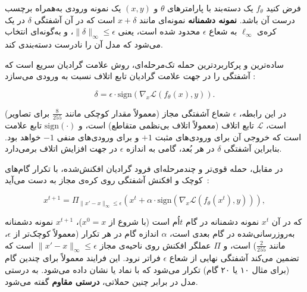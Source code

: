 \documentclass[11pt]{article}
\begin{document}
فرض کنید $f_{\theta}$ یک دسته‌بند با پارامترهای $\theta$ و $(x, y)$ یک نمونه‌ ورودی به‌همراه برچسب درست آن باشد.
\textbf{نمونه دشمنانه} نمونه‌ای مانند $x + \delta$ است که در آن آشفتگی $\delta$ در یک کره‌ی $\ell_{\infty}$ به شعاع $\epsilon$ محدود شده است،
یعنی $\|\delta\|_{\infty} \le \epsilon$، و به‌گونه‌ای انتخاب می‌شود که مدل آن را نادرست دسته‌بندی کند.

ساده‌ترین و پرکاربردترین حمله‌ تک‌مرحله‌ای، روش علامت گرادیان سریع است
که آشفتگی را در جهت علامت گرادیان تابع اتلاف نسبت به ورودی می‌سازد \cite{goodfellow2015explaining}:

\begin{equation}
\delta = \epsilon \cdot \mathrm{sign}\!\left( \nabla_{x} \mathcal{L}(f_{\theta}(x), y) \right).
\end{equation}

در این رابطه، $\epsilon$ شعاع آشفتگی مجاز (معمولاً مقدار کوچکی مانند $\frac{8}{255}$ برای تصاویر) است،
$\mathcal{L}$ تابع اتلاف (معمولاً اتلاف بی‌نظمی متقاطع) است،
و $\mathrm{sign}(\cdot)$ تابع علامت است که خروجی آن برای ورودی‌های مثبت $+1$ و برای ورودی‌های منفی $-1$ خواهد بود.
بنابراین آشفتگی $\delta$ در هر بُعد، گامی به اندازه‌ $\epsilon$ در جهت افزایش اتلاف برمی‌دارد.

در مقابل، حمله‌ قوی‌تر و چندمرحله‌ای فرود گرادیان افکنش‌شده،
با تکرار گام‌های کوچک و افکنش آشفتگی روی کره‌ی مجاز به دست می‌آید~\cite{madry2018towards}:

\begin{equation}
x^{t+1} = \Pi_{\|x'-x\|_{\infty}\le\epsilon}\!\left( x^{t} + \alpha \cdot \mathrm{sign}\!\left( \nabla_{x} \mathcal{L}(f_{\theta}(x^{t}), y) \right) \right),
\end{equation}

که در آن $x^{t}$ نمونه‌ دشمنانه در گام $t$اُم است (با شروع از $x^{0} = x$)،
$x^{t+1}$ نمونه‌ دشمنانه‌ به‌روزرسانی‌شده در گام بعدی است،
$\alpha$ اندازه‌ گام در هر تکرار (معمولاً کوچک‌تر از $\epsilon$، مانند $\frac{2}{255}$) است،
و $\Pi$ عملگر افکنش روی ناحیه‌ی مجاز $\|x'-x\|_{\infty}\le\epsilon$ است
که تضمین می‌کند آشفتگی نهایی از شعاع $\epsilon$ فراتر نرود.
این فرایند معمولاً برای چندین گام (برای مثال ۱۰ یا ۲۰ گام) تکرار می‌شود
که با نماد  یا  نشان داده می‌شود.
به درستی مدل در برابر چنین حملاتی، \textbf{درستی مقاوم} گفته می‌شود.
\end{document}
